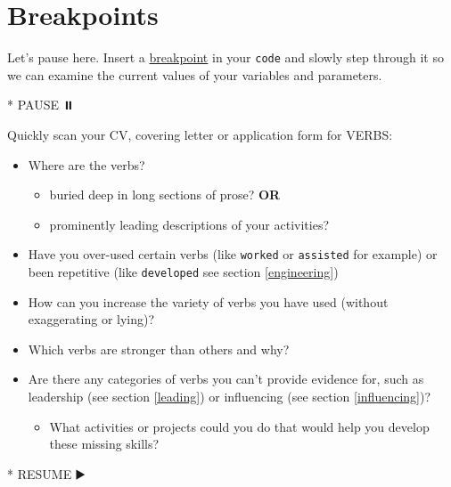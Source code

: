 \documentclass[
]{book}
\newenvironment{Shaded}{\begin{snugshade}}{\end{snugshade}}
\newcommand{\NormalTok}[1]{#1}
\newcommand{\SpecialStringTok}[1]{\textcolor[rgb]{0.31,0.60,0.02}{#1}}
\providecommand{\tightlist}{%
  \setlength{\itemsep}{0pt}\setlength{\parskip}{0pt}}
\begin{document}
\hypertarget{bp17}{%
\section{Breakpoints}\label{bp17}}

Let's pause here. Insert a \href{https://en.wikipedia.org/wiki/Breakpoint}{breakpoint} in your \texttt{code} and slowly step through it so we can examine the current values of your variables and parameters.

\begin{Shaded}
\begin{Highlighting}[]
\SpecialStringTok{* }\NormalTok{PAUSE ⏸️}
\end{Highlighting}
\end{Shaded}

Quickly scan your CV, covering letter or application form for VERBS:

\begin{itemize}
\tightlist
\item
  Where are the verbs?

  \begin{itemize}
  \tightlist
  \item
    buried deep in long sections of prose? \textbf{OR}
  \item
    prominently leading descriptions of your activities?
  \end{itemize}
\item
  Have you over-used certain verbs (like \texttt{worked} or \texttt{assisted} for example) or been repetitive (like \texttt{developed} see section \ref{engineering})
\item
  How can you increase the variety of verbs you have used (without exaggerating or lying)?
\item
  Which verbs are stronger than others and why?
\item
  Are there any categories of verbs you can't provide evidence for, such as leadership (see section \ref{leading}) or influencing (see section \ref{influencing})?

  \begin{itemize}
  \tightlist
  \item
    What activities or projects could you do that would help you develop these missing skills?
  \end{itemize}
\end{itemize}

\begin{Shaded}
\begin{Highlighting}[]
\SpecialStringTok{* }\NormalTok{RESUME ▶️}
\end{Highlighting}
\end{Shaded}
\end{document}
